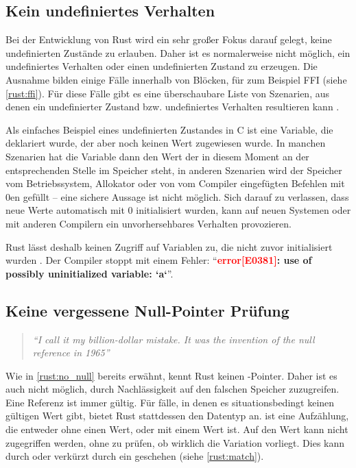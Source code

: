 \subsection{Kein undefiniertes Verhalten}
\label{rust:no_unitialized_usage}
\label{rust:no_undefined}

Bei der Entwicklung von Rust wird ein sehr großer Fokus darauf gelegt, keine undefinierten Zustände zu erlauben.
Daher ist es normalerweise nicht möglich, ein undefiniertes Verhalten oder einen undefinierten Zustand zu erzeugen.
Die Ausnahme bilden einige Fälle innerhalb von  Blöcken, für zum Beispiel FFI (siehe \autoref{rust:ffi}).
Für diese Fälle gibt es eine überschaubare Liste von Szenarien, aus denen ein undefinierter Zustand bzw. undefiniertes Verhalten resultieren kann \cite{rust:book:undefined}.

Als einfaches Beispiel eines undefinierten Zustandes in C ist eine Variable, die deklariert wurde, der aber noch keinen Wert zugewiesen wurde.
In manchen Szenarien hat die Variable dann den Wert der in diesem Moment an der entsprechenden Stelle im Speicher steht, in anderen Szenarien wird der Speicher vom Betriebssystem, Allokator oder von vom Compiler eingefügten Befehlen mit 0en gefüllt -- eine sichere Aussage ist nicht möglich.
Sich darauf zu verlassen, dass neue Werte automatisch mit 0 initialisiert wurden, kann auf neuen Systemen oder mit anderen Compilern ein unvorhersehbares Verhalten provozieren.

Rust lässt deshalb keinen Zugriff auf Variablen zu, die nicht zuvor initialisiert wurden \cite[126]{rust:orly_programming}.
Der Compiler stoppt mit einem Fehler: \enquote{\textbf{\textcolor{red}{error[E0381]}: use of possibly uninitialized variable: `a`}}.


\subsection{Keine vergessene Null-Pointer Prüfung}
\label{rust:no_null_detail}

\begin{quotation}
	\textit{\enquote{I call it my billion-dollar mistake. It was the invention of the null reference in 1965}}
	\cite[Tony Hoare, QCon Software Konferenz in London, 2009]{rust:infoq:null}
\end{quotation}

Wie in \autoref{rust:no_null} bereits erwähnt, kennt Rust keinen -Pointer.
Daher ist es auch nicht möglich, durch Nachlässigkeit auf den falschen Speicher zuzugreifen.
Eine Referenz ist immer gültig.
Für fälle, in denen es situationsbedingt keinen gültigen Wert gibt, bietet Rust stattdessen den  Datentyp an.
 ist eine Aufzählung, die entweder  ohne einen Wert, oder  mit einem Wert ist.
Auf den Wert kann nicht zugegriffen werden, ohne zu prüfen, ob wirklich die Variation  vorliegt.
Dies kann durch  oder verkürzt durch ein  geschehen (siehe \autoref{rust:match}).

